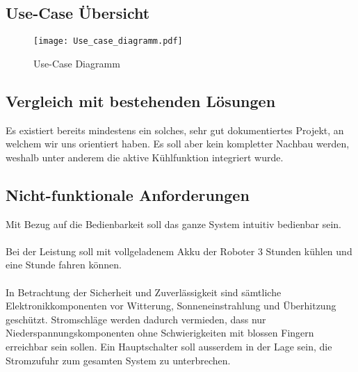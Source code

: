 \subsection{Use-Case Übersicht}
\begin{figure}[H]
    \begin{center}
    \texttt{[image: Use\_case\_diagramm.pdf]}
    \end{center}
    \caption{Use-Case Diagramm}
\end{figure}

\begin{table}[H]
    \centering
    \caption{Use-Case Übersicht}
    \label{tab:Use-Case}
    \end{table}


\subsection{Vergleich mit bestehenden Lösungen}
Es existiert bereits mindestens ein solches, sehr gut dokumentiertes Projekt, an welchem wir uns orientiert haben. Es soll aber kein kompletter Nachbau werden, weshalb unter anderem die aktive Kühlfunktion integriert wurde.

\pagebreak

\subsection{Nicht-funktionale Anforderungen}
Mit Bezug auf die Bedienbarkeit soll das ganze System intuitiv bedienbar sein.\\
\\
Bei der Leistung soll mit vollgeladenem Akku der Roboter 3 Stunden kühlen und eine Stunde fahren können.\\
\\
In Betrachtung der Sicherheit und Zuverlässigkeit sind sämtliche Elektronikkomponenten vor Witterung, Sonneneinstrahlung und Überhitzung geschützt. Stromschläge werden dadurch vermieden, dass nur Niederspannungskomponenten ohne Schwierigkeiten mit blossen Fingern erreichbar sein sollen. Ein Hauptschalter soll ausserdem in der Lage sein, die Stromzufuhr zum gesamten System zu unterbrechen.
